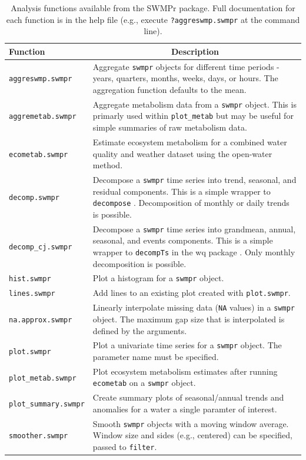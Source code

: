 \documentclass[10pt,letterpaper]{article}\usepackage[]{graphicx}\usepackage[]{color}
\begin{document}
\begin{table}[!tbp]
\caption{Analysis functions available from the SWMPr package.  Full documentation for each function is in the help file (e.g., execute \texttt{?aggreswmp.swmpr} at the command line).\label{tab:analyze}} 
\begin{center}
\begin{tabular}{lp{3.5in}}
\hline\hline
\multicolumn{1}{l}{Function}&\multicolumn{1}{c}{Description}\tabularnewline
\hline
\texttt{aggreswmp.swmpr}&Aggregate \texttt{swmpr} objects for different time periods - years, quarters, months,  weeks, days, or hours.  The aggregation function defaults to the mean.\tabularnewline
\texttt{aggremetab.swmpr}&Aggregate metabolism data from a \texttt{swmpr} object.  This is primarly used within \texttt{plot\_metab} but may be useful for simple summaries of raw metabolism data.\tabularnewline
\texttt{ecometab.swmpr}&Estimate ecosystem metabolism for a combined water quality and weather dataset using the open-water method.\tabularnewline
\texttt{decomp.swmpr}&Decompose a \texttt{swmpr} time series into trend, seasonal, and residual components.  This is a simple wrapper to \texttt{decompose} \cite{Kendall83}.  Decomposition of monthly or daily trends is possible.\tabularnewline
\texttt{decomp\_cj.swmpr}&Decompose a \texttt{swmpr} time series into grandmean, annual, seasonal, and events components.  This is a simple wrapper to \texttt{decompTs} in the wq package \cite{Jassby14}.  Only monthly decomposition is possible.\tabularnewline
\texttt{hist.swmpr}&Plot a histogram for a \texttt{swmpr} object.\tabularnewline
\texttt{lines.swmpr}&Add lines to an existing plot created with \texttt{plot.swmpr}.\tabularnewline
\texttt{na.approx.swmpr}&Linearly interpolate missing data (\texttt{NA} values) in a \texttt{swmpr} object. The maximum gap size that is interpolated is defined by the arguments.\tabularnewline
\texttt{plot.swmpr}&Plot a univariate  time series for a \texttt{swmpr} object.  The parameter name must be specified.\tabularnewline
\texttt{plot\_metab.swmpr}&Plot ecosystem metabolism estimates after running \texttt{ecometab} on a \texttt{swmpr} object.\tabularnewline
\texttt{plot\_summary.swmpr}&Create summary plots of seasonal/annual trends and anomalies for a water a single paramter of interest.\tabularnewline
\texttt{smoother.swmpr}&Smooth \texttt{swmpr} objects with a moving window average.  Window size and sides (e.g., centered) can be specified, passed to \texttt{filter}.\tabularnewline
\hline
\end{tabular}\end{center}

\end{table}
\end{document}
